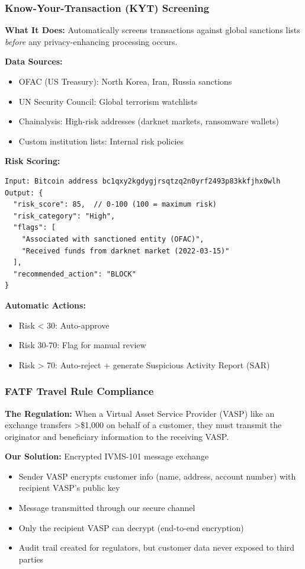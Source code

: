 \documentclass[11pt,a4paper]{article}
\begin{document}
\subsubsection{Know-Your-Transaction (KYT) Screening}

\textbf{What It Does:} Automatically screens transactions against global sanctions lists \textit{before} any privacy-enhancing processing occurs.

\textbf{Data Sources:}
\begin{itemize}
    \item OFAC (US Treasury): North Korea, Iran, Russia sanctions
    \item UN Security Council: Global terrorism watchlists
    \item Chainalysis: High-risk addresses (darknet markets, ransomware wallets)
    \item Custom institution lists: Internal risk policies
\end{itemize}

\textbf{Risk Scoring:}
\begin{verbatim}
Input: Bitcoin address bc1qxy2kgdygjrsqtzq2n0yrf2493p83kkfjhx0wlh
Output: {
  "risk_score": 85,  // 0-100 (100 = maximum risk)
  "risk_category": "High",
  "flags": [
    "Associated with sanctioned entity (OFAC)",
    "Received funds from darknet market (2022-03-15)"
  ],
  "recommended_action": "BLOCK"
}
\end{verbatim}

\textbf{Automatic Actions:}
\begin{itemize}
    \item Risk < 30: Auto-approve
    \item Risk 30-70: Flag for manual review
    \item Risk > 70: Auto-reject + generate Suspicious Activity Report (SAR)
\end{itemize}

\subsubsection{FATF Travel Rule Compliance}

\textbf{The Regulation:} When a Virtual Asset Service Provider (VASP) like an exchange transfers >\$1,000 on behalf of a customer, they must transmit the originator and beneficiary information to the receiving VASP.

\textbf{Our Solution:} Encrypted IVMS-101 message exchange
\begin{itemize}
    \item Sender VASP encrypts customer info (name, address, account number) with recipient VASP's public key
    \item Message transmitted through our secure channel
    \item Only the recipient VASP can decrypt (end-to-end encryption)
    \item Audit trail created for regulators, but customer data never exposed to third parties
\end{itemize}
\end{document}
